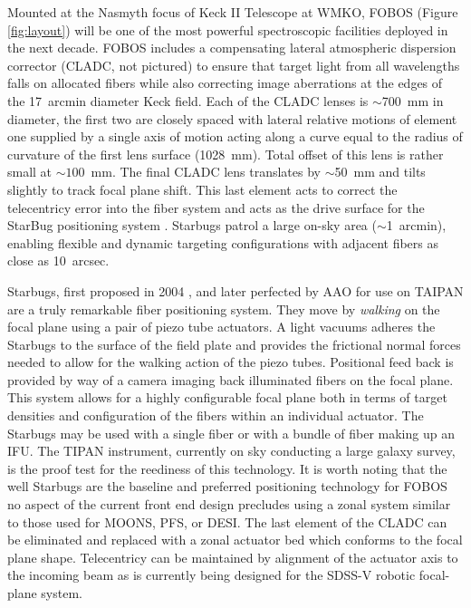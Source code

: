 Mounted at the Nasmyth focus of Keck II Telescope at WMKO, FOBOS (Figure
\ref{fig:layout}) will be one of the most powerful spectroscopic
facilities deployed in the next decade. FOBOS includes a compensating
lateral atmospheric dispersion corrector (CLADC, not pictured) to ensure
that target light from all wavelengths falls on allocated fibers while
also correcting image aberrations at the edges of the 17~arcmin diameter
Keck field. Each of the CLADC lenses is $\sim$700~mm in diameter, the
first two are closely spaced with lateral relative motions of element
one supplied by a single axis of motion acting along a curve equal to
the radius of curvature of the first lens surface (1028~mm). Total
offset of this lens is rather small at $\sim1$00~mm.  The final CLADC
lens translates by $\sim$50~mm and tilts slightly to track focal plane
shift. This last element acts to correct the telecentricy error into the
fiber system and acts as the drive surface for the StarBug positioning
system . Starbugs patrol a large on-sky area
($\sim$1~arcmin), enabling flexible and dynamic targeting configurations
with adjacent fibers as close as 10~arcsec.  


Starbugs, first proposed in 2004 \citep{2004SPIE.5495..600M}, and
later perfected by AAO for use on TAIPAN \citep{2016SPIE.9912E..1WS}
are a truly remarkable fiber positioning system. They move by {\it
walking} on the focal plane using a pair of piezo tube actuators. A
light vacuums adheres the Starbugs to the surface of the field plate
and provides the frictional normal forces needed to allow for the
walking action of the piezo tubes. Positional feed back is provided
by way of a camera imaging back illuminated fibers on the focal
plane. This system allows for a highly configurable focal plane both
in terms of target densities and configuration of the fibers within
an individual actuator. The Starbugs may be used with a single fiber
or with a bundle of fiber making up an IFU. The TIPAN instrument,
currently on sky conducting a large galaxy survey, is the proof test
for the reediness of this technology. It is worth noting that the
well Starbugs are the baseline and preferred positioning technology
for FOBOS no aspect of the current front end design precludes using a
zonal system similar to those used for MOONS, PFS, or DESI. The last
element of the CLADC can be eliminated and replaced with a zonal
actuator bed which conforms to the focal plane shape. Telecentricy
can be maintained by alignment of the actuator axis to the incoming
beam as is currently being designed for the SDSS-V robotic
focal-plane system.

